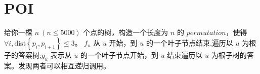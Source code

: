 \section{POI}


\prob 给你一棵 $n\ (n\le 5000)$ 个点的树，构造一个长度为 $n$ 的 $permutation$，使得 $\forall i, \mathrm{dist}\left\{p_i, p_{i+1}\right\}\le 3$。
\sol $f_u$ 从 $u$ 开始，到 $u$ 的一个叶子节点结束,遍历以 $u$ 为根子的答案树;$g_u$ 表示从 $u$ 的一个叶子节点开始，到 $u$ 结束遍历以 $u$ 为根子树的答案。发现两者可以相互递归调用。
